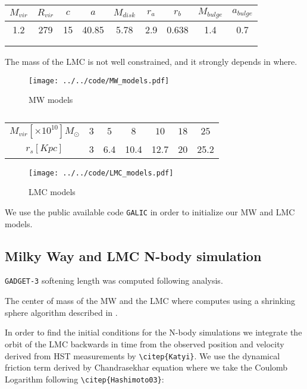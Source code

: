 \documentclass[a4paper,fleqn,usenatbib]{mnras}
\begin{document}
\begin{table}
\begin{tabular}{c c c c c c c c c}
\hline
\hline
$M_{vir}$ & $R_{vir}$ & $c$ & $a$ & $M_{disk}$ & $r_a$ & $r_b$ & $M_{bulge}$
& $a_{bulge}$\\
\hline
1.2 & 279 & 15 & 40.85 & 5.78  & 2.9 & 0.638 & 1.4 & 0.7\\
 & & & & & & & & \\
 & & & & & & & & \\
\hline
\end{tabular}
\caption{\label{tab:MWmodels}}
\end{table}

The mass of the LMC is not well constrained, and it strongly depends
in where.

\begin{figure*}
 \centering
 \texttt{[image: ../../code/MW\_models.pdf]}
 \caption{ MW models}
 \label{fig:MWmodels}
\end{figure*}


\begin{table}
\begin{tabular}{c c c c c c c}
\hline
\hline
$M_{vir} [\times 10^{10}] M_{\odot}$ & $3$ & $5$ & $ 8$& $10$ & $18$ &
$25$ \\
$r_{s} [Kpc]$ & 3 & 6.4& 10.4& 12.7& 20 & 25.2\\
\hline
\hline
\end{tabular}
\caption{\label{tab:LMCmodels}}
\end{table}

\begin{figure*}
 \centering
 \texttt{[image: ../../code/LMC\_models.pdf]}
 \caption{ LMC models}
 \label{fig:LMCmodels}
\end{figure*}

We use the public available code \verb+GALIC+ \citep{Yurin14} in order
to initialize our MW and LMC models. 

\subsection{Milky Way and LMC N-body simulation}

\verb+GADGET-3+ \citep{Springel05}
softening length was computed following \citep{Power03} analysis.


The center of mass of the MW and the LMC where computes using a
shrinking sphere algorithm described in \citep{Power03}.


In order to find the initial conditions for the N-body simulations
we integrate the orbit of the LMC backwards in time from the observed
position and velocity derived from HST measurements by
\verb+\citep{Katyi}+. We use the dynamical friction term derived by 
Chandrasekhar equation \citep{Chandrasekhar44} where we take the
Coulomb Logarithm following \verb+\citep{Hashimoto03}+: 
\end{document}

